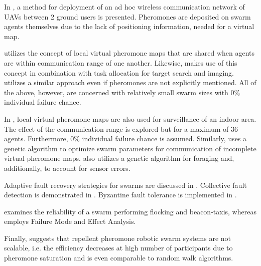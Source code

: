 \par In \parencite{hauert_ant-based_2008}, a method for deployment of an ad hoc wireless communication network of UAVs between 2 ground users is presented. Pheromones are deposited on swarm agents themselves due to the lack of positioning information, needed for a virtual map. 
\par \parencite{kuiper_mobility_2006} utilizes the concept of local virtual pheromone maps that are shared when agents are within communication range of one another. Likewise, \parencite{parunak_swarming_2003} makes use of this concept in combination with task allocation for target search and imaging. \parencite{pack_developing_2005} utilizes a similar approach even if pheromones are not explicitly mentioned. All of the above, however, are concerned with relatively small swarm sizes with 0\% individual failure chance. 
\par In \parencite{tinoco_pherocom_2022}, local virtual pheromone maps are also used for surveillance of an indoor area. The effect of the communication range is explored but for a maximum of 36 agents. Furthermore, 0\% individual failure chance is assumed. Similarly, \parencite{nguyen_improving_2021} uses a genetic algorithm to optimize swarm parameters for communication of incomplete virtual pheromone maps. \parencite{hecker_beyond_2015} also utilizes a genetic algorithm for foraging and, additionally, to account for sensor errors.
\par Adaptive fault recovery strategies for swarms are discussed in \parencite{oladiran_fault_nodate}. Collective fault detection is demonstrated in \parencite{christensen_fireflies_2009}. Byzantine fault tolerance is implemented in \parencite{liao_uav_2021}.
\par \parencite{bjerknes_fault_2013} examines the reliability of a swarm performing flocking and beacon-taxis, whereas \parencite{winfield_safety_2006} employs Failure Mode and Effect Analysis.
\par Finally, \parencite{hunt_testing_2019} suggests that repellent pheromone robotic swarm systems are not scalable, i.e. the efficiency decreases at high number of participants due to pheromone saturation and is even comparable to random walk algorithms.
